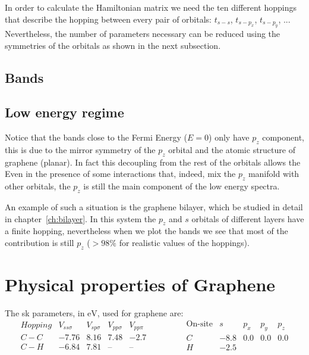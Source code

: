 In order to calculate the Hamiltonian matrix we need the ten different hoppings that describe the hopping between every pair of orbitals: $t_{s-s}$, $t_{s-p_x}$, $t_{s-p_y}$, ... Nevertheless, the number of parameters necessary can be reduced using the symmetries of the orbitals as shown in the next subsection.



\subsection{Bands}



\subsection{Low energy regime}
Notice that the bands close to the Fermi Energy ($E=0$) only have $p_z$ component, this is due to the mirror symmetry of the $p_z$ orbital and the atomic structure of graphene (planar). In fact this decoupling from the rest of the orbitals allows the
Even in the presence of some interactions that, indeed, mix the $p_z$ manifold with other orbitals, the $p_z$ is still the main component of the low energy spectra.

An example of such a situation is the graphene bilayer, which be studied in detail in chapter~\ref{ch:bilayer}. In this system the $p_z$ and $s$ orbitals of different layers have a finite hopping, nevertheless when we plot the bands %
we see that most of the contribution is still $p_z$ ($>98\%$ for realistic values of the hoppings).







\section{Physical properties of Graphene}
The \ac{sk} parameters, in $\si{\eV}$, used for graphene are:
\begin{equation}
  \begin{array}{l|cccc}
    Hopping & V_{ss\sigma} & V_{sp\sigma} & V_{pp\sigma} & V_{pp\pi} \\ \hline
    C-C & -7.76 & 8.16 & 7.48 & -2.7 \\
    C-H & -6.84 & 7.81 & \text{--} & \text{--}
  \end{array}\qquad\qquad
  \begin{array}{c|cccc}
    \text{On-site} & s & p_x & p_y & p_z \\ \hline
    C & -8.8 & 0.0 & 0.0 & 0.0 \\
    H & -2.5 &     &     &
  \end{array}
\label{SK_params}
\end{equation}








%
